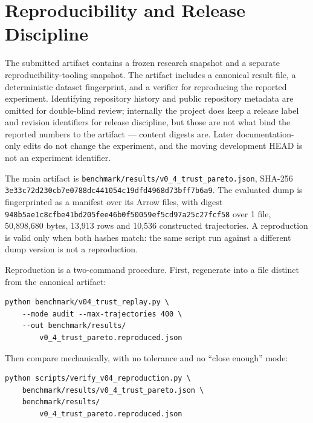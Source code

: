 \documentclass[letterpaper,twocolumn,10pt]{article}
\newcommand{\hb}{\allowbreak}
\begin{document}
\section{Reproducibility and Release Discipline}
\label{sec:repro}

The submitted artifact contains a frozen research snapshot and a separate
reproducibility-tooling snapshot. The artifact includes a canonical result
file, a deterministic dataset fingerprint, and a verifier for reproducing the
reported experiment. Identifying repository history and public repository
metadata are omitted for double-blind review; internally the project does keep
a release label and revision identifiers for release discipline, but those are
not what bind the reported numbers to the artifact --- content digests are.
Later documentation-only edits do not change the experiment, and the moving
development HEAD is not an experiment identifier.

The main artifact is \texttt{benchmark/results/v0\_4\_trust\_pareto.json},
SHA-256 \texttt{3e33\hb c72d\hb 230c\hb b7e0\hb 788d\hb c441\hb 2574\hb 054c\hb 19df\hb d496\hb 5465\hb 7369\hb 8d73\hb bff7\hb b6a9\hb 0565}.
The evaluated dump is fingerprinted as a manifest over its Arrow files, with
digest \texttt{948b\hb 9432\hb 5ae1\hb c8cf\hb be41\hb bd20\hb 5fee\hb 46b0\hb f500\hb 2155\hb 59ef\hb 5cd9\hb 7a25\hb c27f\hb cf58\hb 0049}
over 1 file, 50,898,680 bytes, 13,913 rows and 10,536 constructed trajectories.
A reproduction is valid only when both hashes match: the same script run against
a different dump version is not a reproduction.

Reproduction is a two-command procedure. First, regenerate into a file distinct
from the canonical artifact:

{\small
\begin{verbatim}
python benchmark/v04_trust_replay.py \
    --mode audit --max-trajectories 400 \
    --out benchmark/results/
        v0_4_trust_pareto.reproduced.json
\end{verbatim}
}

Then compare mechanically, with no tolerance and no ``close enough'' mode:

{\small
\begin{verbatim}
python scripts/verify_v04_reproduction.py \
    benchmark/results/v0_4_trust_pareto.json \
    benchmark/results/
        v0_4_trust_pareto.reproduced.json
\end{verbatim}
}
\end{document}
